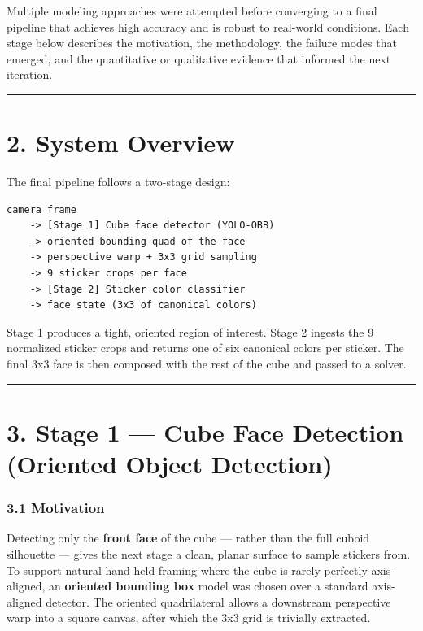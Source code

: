 \documentclass[
  11pt,
  a4paper,
]{article}
\begin{document}
Multiple modeling approaches were attempted before converging to a final
pipeline that achieves high accuracy and is robust to real-world
conditions. Each stage below describes the motivation, the methodology,
the failure modes that emerged, and the quantitative or qualitative
evidence that informed the next iteration.

\begin{center}\rule{0.5\linewidth}{0.5pt}\end{center}

\section{2. System Overview}\label{system-overview}

The final pipeline follows a two-stage design:

\begin{verbatim}
camera frame
    -> [Stage 1] Cube face detector (YOLO-OBB)
    -> oriented bounding quad of the face
    -> perspective warp + 3x3 grid sampling
    -> 9 sticker crops per face
    -> [Stage 2] Sticker color classifier
    -> face state (3x3 of canonical colors)
\end{verbatim}

Stage 1 produces a tight, oriented region of interest. Stage 2 ingests
the 9 normalized sticker crops and returns one of six canonical colors
per sticker. The final 3x3 face is then composed with the rest of the
cube and passed to a solver.

\begin{center}\rule{0.5\linewidth}{0.5pt}\end{center}

\section{3. Stage 1 --- Cube Face Detection (Oriented Object
Detection)}\label{stage-1-cube-face-detection-oriented-object-detection}

\subsubsection{3.1 Motivation}\label{motivation}

Detecting only the \textbf{front face} of the cube --- rather than the
full cuboid silhouette --- gives the next stage a clean, planar surface
to sample stickers from. To support natural hand-held framing where the
cube is rarely perfectly axis-aligned, an \textbf{oriented bounding box}
model was chosen over a standard axis-aligned detector. The oriented
quadrilateral allows a downstream perspective warp into a square canvas,
after which the 3x3 grid is trivially extracted.
\end{document}
